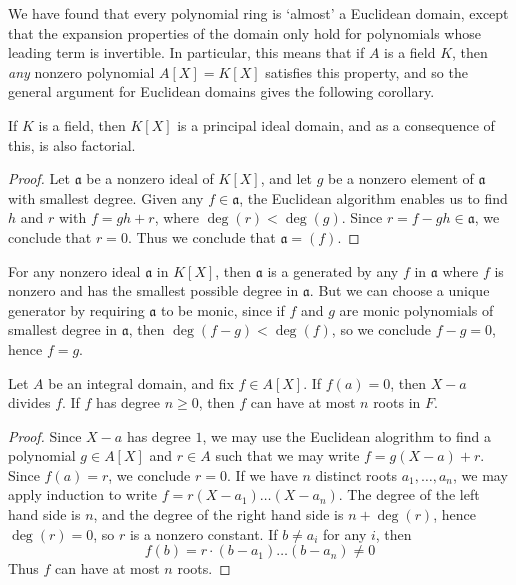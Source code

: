 We have found that every polynomial ring is `almost' a Euclidean domain, except that the expansion properties of the domain only hold for polynomials whose leading term is invertible. In particular, this means that if $A$ is a field $K$, then {\it any} nonzero polynomial $A[X] = K[X]$ satisfies this property, and so the general argument for Euclidean domains gives the following corollary.

\begin{corollary}
    If $K$ is a field, then $K[X]$ is a principal ideal domain, and as a consequence of this, is also factorial.
\end{corollary}
\begin{proof}
	Let $\mathfrak{a}$ be a nonzero ideal of $K[X]$, and let $g$ be a nonzero element of $\mathfrak{a}$ with smallest degree. Given any $f \in \mathfrak{a}$, the Euclidean algorithm enables us to find $h$ and $r$ with $f = gh + r$, where $\deg(r) < \deg(g)$. Since $r = f - gh \in \mathfrak{a}$, we conclude that $r = 0$. Thus we conclude that $\mathfrak{a} = (f)$.
\end{proof}

\begin{remark}
	For any nonzero ideal $\mathfrak{a}$ in $K[X]$, then $\mathfrak{a}$ is a generated by any $f$ in $\mathfrak{a}$ where $f$ is nonzero and has the smallest possible degree in $\mathfrak{a}$. But we can choose a unique generator by requiring $\mathfrak{a}$ to be monic, since if $f$ and $g$ are monic polynomials of smallest degree in $\mathfrak{a}$, then $\deg(f - g) < \deg(f)$, so we conclude $f - g = 0$, hence $f = g$.
\end{remark}

\begin{theorem}
	Let $A$ be an integral domain, and fix $f \in A[X]$. If $f(a) = 0$, then $X - a$ divides $f$. If $f$ has degree $n \geq 0$, then $f$ can have at most $n$ roots in $F$.
\end{theorem}
\begin{proof}
	Since $X - a$ has degree $1$, we may use the Euclidean alogrithm to find a polynomial $g \in A[X]$ and $r \in A$ such that we may write $f = g (X - a) + r$. Since $f(a) = r$, we conclude $r = 0$. If we have $n$ distinct roots $a_1, \dots, a_n$, we may apply induction to write $f = r(X - a_1) \dots (X - a_n)$. The degree of the left hand side is $n$, and the degree of the right hand side is $n + \deg(r)$, hence $\deg(r) = 0$, so $r$ is a nonzero constant. If $b \neq a_i$ for any $i$, then
    \[ f(b) = r \cdot (b - a_1) \dots (b - a_n) \neq 0 \]
    Thus $f$ can have at most $n$ roots.
\end{proof}

